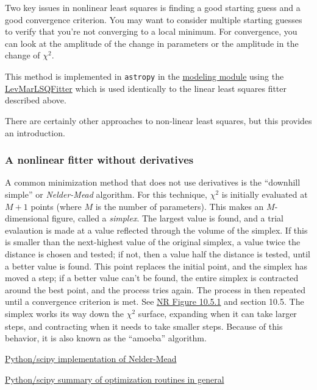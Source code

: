 \documentclass[12pt]{article}
\begin{document}
Two key issues in nonlinear least squares is finding a good starting
guess and a good convergence criterion. You may want to consider
multiple starting guesses to verify that you're not converging to a
local minimum. For convergence, you can look at the amplitude of the
change in parameters or the amplitude in the change of $ \chi^{2}_{}$.

This method is implemented in \texttt{astropy} in the
\href{http://astropy.readthedocs.org/en/v1.0.6/modeling/index.html}
{modeling module} using the
\href{http://docs.astropy.org/en/stable/api/astropy.modeling.fitting.LevMarLSQFitter.html}
{LevMarLSQFitter} which is used identically to the linear least squares
fitter described above.

There are certainly other approaches to non-linear least squares, but
this provides an introduction.


\subsubsection{A nonlinear fitter without derivatives}
A common minimization method that does not use derivatives is the
``downhill simple'' or \emph{Nelder-Mead} algorithm.
For this technique, $\chi^{2}$ is initially evaluated at $M+1$ points
(where $M$ is the number of parameters).
This makes an $M$-dimensional figure, called a \emph{simplex}.
The largest value is found, and a trial evalaution is made at
a value reflected through the volume of the simplex. If this is
smaller than the next-highest value of the original simplex, a value
twice the distance is chosen and tested; if not, then a value half the
distance is tested, until a better value is found. This point replaces
the initial point, and the simplex has moved a step; if a better value
can't be found, the entire simplex is contracted around the best
point, and the process tries again. The process in then repeated until
a convergence criterion is met. See
\href{}
{NR Figure 10.5.1} and section 10.5.
The simplex works its way down the $ \chi^{2}_{}$ surface, expanding
when it can take larger steps, and contracting when it needs to take
smaller steps. Because of this behavior, it is also known as the
``amoeba'' algorithm.

\href{http://docs.scipy.org/doc/scipy-0.16.0/reference/generated/scipy.optimize.fmin.html}
{Python/scipy implementation of Nelder-Mead}

\href{https://docs.scipy.org/doc/scipy-0.16.1/reference/tutorial/optimize.html}
{Python/scipy summary of optimization routines in general}
\end{document}
